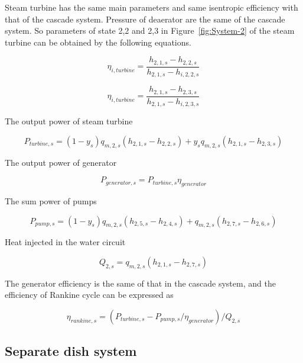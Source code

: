 \documentclass{article}
\begin{document}
Steam turbine has the same main parameters and same isentropic efficiency with that of the cascade system. Pressure of deaerator are the same of the cascade system. So parameters of state 2,2 and 2,3 in Figure~\ref{fig:System-2} of the steam turbine can be obtained by the following equations.

\begin{equation*}
	\eta_{i,turbine}=\frac{h_{2,1,s}-h_{2,2,s}}{h_{2,1,s}-h_{i,2,2,s}}
\end{equation*}

\begin{equation*}
	\eta_{i,turbine}=\frac{h_{2,1,s}-h_{2,3,s}}{h_{2,1,s}-h_{i,2,3,s}}
\end{equation*}

The output power of steam turbine

\begin{equation*}
	P_{turbine,s}=\left(1-y_{s}\right)q_{m,2,s}\left(h_{2,1,s}-h_{2,2,s}\right)+y_{s}q_{m,2,s}\left(h_{2,1,s}-h_{2,3,s}\right)
\end{equation*}

The output power of generator

\begin{equation*}
	P_{generator,s}=P_{turbine,s}\eta_{generator}
\end{equation*}

The sum power of pumps

\begin{equation*}
	P_{pump,s}=\left(1-y_{s}\right)q_{m,2,s}\left(h_{2,5,s}-h_{2,4,s}\right)+q_{m,2,s}\left(h_{2,7,s}-h_{2,6,s}\right)
\end{equation*}

Heat injected in the water circuit

\begin{equation*}
	Q_{2,s}=q_{m,2,s}\left(h_{2,1,s}-h_{2,7,s}\right)
\end{equation*}

The generator efficiency is the same of that in the cascade system, and the efficiency of Rankine cycle can be expressed as

\begin{equation*}
	\eta_{rankine,s}=(P_{turbine,s}-P_{pump,s}/\eta_{generator})/Q_{2,s}
\end{equation*}

\subsection{Separate dish system}
\end{document}
